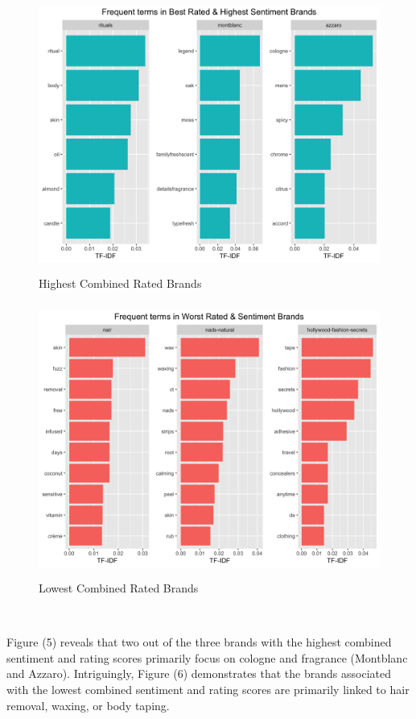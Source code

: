 \documentclass[10pt]{article}
\begin{document}
\begin{figure}[ht!]
    \centering
    \hspace*{-3em}
    \includegraphics[height=90mm, width=130mm]{best_mr_brands.png}
    \caption{Highest Combined Rated Brands}
\end{figure}

\begin{figure}[ht!]
    \centering
    \hspace*{-3em}
    \includegraphics[height=90mm, width=130mm]{worst_mr_brands.png}
    \caption{Lowest Combined Rated Brands}
\end{figure}

\

Figure (5) reveals that two out of the three brands with the highest combined sentiment and rating scores primarily focus on cologne and fragrance (Montblanc and Azzaro). Intriguingly, Figure (6) demonstrates that the brands associated with the lowest combined sentiment and rating scores are primarily linked to hair removal, waxing, or body taping. 
\end{document}
